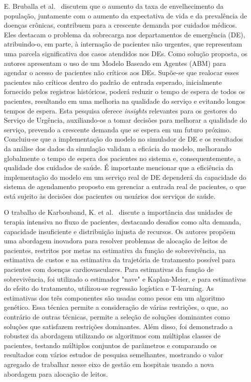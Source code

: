 E. Bruballa et al.~\cite{8945359} discutem que o aumento da taxa de envelhecimento da população, juntamente com o aumento da expectativa de vida e da prevalência de doenças crônicas, contribuem para a crescente demanda por cuidados médicos. Eles destacam o problema da sobrecarga nos departamentos de emergência (DE), atribuindo-o, em parte, à internação de pacientes não urgentes, que representam uma parcela significativa dos casos atendidos nos DEs. Como solução proposta, os autores apresentam o uso de um Modelo Baseado em Agentes (ABM) para agendar o acesso de pacientes não críticos aos DEs. Supõe-se que realocar esses pacientes não críticos dentro do padrão de entrada esperado, inicialmente fornecido pelos registros históricos, poderá reduzir o tempo de espera de todos os pacientes, resultando em uma melhoria na qualidade do serviço e evitando longos tempos de espera. Esta pesquisa oferece \textit{insights} relevantes para os gestores do Serviço de Urgência, auxiliando-os a tomar decisões para melhorar a qualidade do serviço, prevendo a crescente demanda que se espera em um futuro próximo. Concluiu-se que a implementação do modelo no simulador de DE e os resultados da análise dos dados da simulação validam a eficácia do modelo, melhorando globalmente o tempo de espera dos pacientes no sistema e, consequentemente, a qualidade dos cuidados de saúde. É importante mencionar que a eficiência da implementação do modelo em um serviço real de DE dependerá da capacidade do sistema de agendamento proposto em gerenciar a entrada real de pacientes, o que está sujeito às decisões dos pacientes ou usuários dos serviços de saúde.

O trabalho de Karbouband, K. et al.~\cite{10078258} discute a importância das unidades de terapia intensiva no fluxo de pacientes, destacando desafios como alta demanda, capacidade insuficiente e distribuição injusta de recursos. Os autores propõem uma abordagem inovadora para resolver problemas de alocação de leitos de pacientes, restritos por metas na estimativa da função de sobrevivência, na estimativa de custos e na estimativa da trajetória de tratamento possível para pacientes com doenças cardiovasculares. Para estimativas da função de sobrevivência, foi utilizado o estimador "nave" e Kaplan-Meier, e para estimativas do efeito do tratamento, utilizou-se regressão logística e T-learning. As estimativas dos três componentes são usadas como pesos em um algoritmo genético. Essa técnica permite a consideração de várias restrições, o que, ao contrário de outras técnicas, permite a seleção de soluções dominantes como soluções que satisfazem restrições dominantes. Além disso, foi demonstrado a robustez da abordagem utilizando os algoritmos com múltiplas classes de pacientes, testando múltiplos conjuntos de parâmetros e comparando os resultados com vários estudos de pesquisa semelhantes, mostrando o valor agregado de trabalhar nesse eixo de gestão em hospitais usando a nova abordagem para alocação de leitos.

